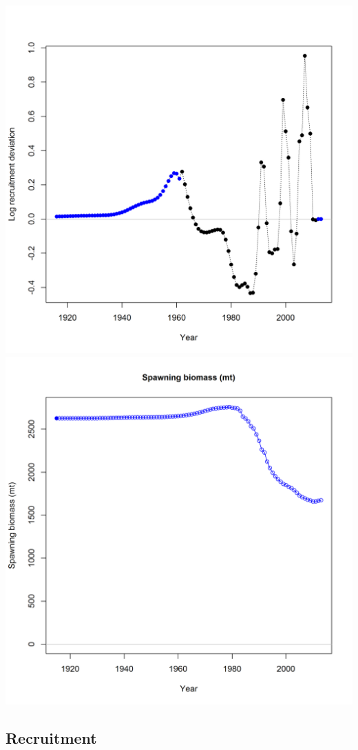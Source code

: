 \documentclass[12pt,]{article}
\begin{document}
\includegraphics{plots/recdevs1_points.png}
\includegraphics{plots/ts7Spawningbiomass(mt).png}

\subsection*{Recruitment}\label{recruitment}
\end{document}
